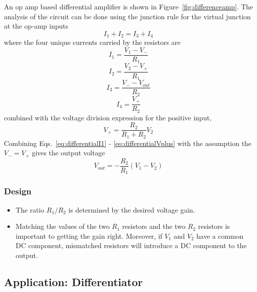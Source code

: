 \documentclass[11pt]{article}
\begin{document}
An op amp based differential amplifier is shown in
Figure~\ref{fig:differenceamp}. The analysis of the circuit can be
done using the junction rule for the virtual junction at the op-amp
inputs
\begin{equation}
  I_1 + I_2 = I_3 + I_4
\end{equation}
where the four unique currents carried by the resistors are
\begin{equation}
  \label{eq:differentialI1}
  I_1 = \frac{V_1 - V_-}{R_1}
\end{equation}
\begin{equation}
  I_2 = \frac{V_2 - V_+}{R_1}
\end{equation}
\begin{equation}
  I_3 = \frac{V_- - V_{out}}{R_2}
\end{equation}
\begin{equation}
  I_4 = \frac{V_+}{R_2}
\end{equation}
combined with the voltage division expression for the positive input,
\begin{equation}
  \label{eq:differentialVplus}
  V_+ = \frac{R_2}{R_1 + R_2} V_2
\end{equation}
Combining Eqs.~\ref{eq:differentialI1} - \ref{eq:differentialVplus}
with the assumption the $V_- = V_+$ gives the output voltage
\begin{equation}
  V_{out} = - \frac{R_2}{R_1} \left(V_1 - V_2\right)
\end{equation}

\subsubsection*{Design}
\begin{itemize}
\item The ratio $R_1/R_2$ is determined by the desired voltage gain.

\item Matching the values of the two $R_1$ resistors and the two $R_2$
  resistors is important to getting the gain right. Moreover, if $V_1$
  and $V_2$ have a common DC component, mismatched resistors will
  introduce a DC component to the output.

\end{itemize}

\subsection{Application: Differentiator}
\label{sec:differentiator}
\end{document}
